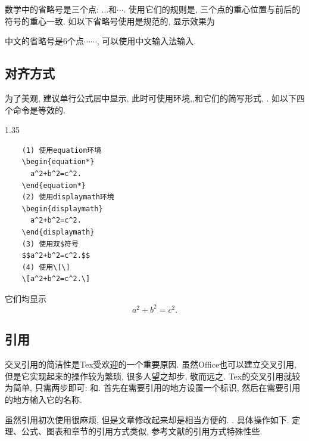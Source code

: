 \documentclass[a4paper,12pt,twoside]{ctexart}
\begin{document}
    数学中的省略号是三个点: $\ldots$和$\cdots$. 使用它们的规则是, 三个点的重心位置与前后的符号的重心一致. 如以下省略号使用是规范的,
    \noindent 显示效果为\medskip

    \noindent

    中文的省略号是6个点$\cdots\cdots$, 可以使用中文输入法输入.


\subsection{对齐方式}
    为了美观, 建议单行公式居中显示, 此时可使用环境,,和它们的简写形式, . 如以下四个命令是等效的. \\[-20pt]
    \begin{spacing}{1.35}
    \begin{verbatim}
    (1) 使用equation环境
    \begin{equation*}
      a^2+b^2=c^2.
    \end{equation*}
    (2) 使用displaymath环境
    \begin{displaymath}
      a^2+b^2=c^2.
    \end{displaymath}
    (3) 使用双$符号
    $$a^2+b^2=c^2.$$
    (4) 使用\[\]
    \[a^2+b^2=c^2.\]
    \end{verbatim}
    \end{spacing}\vspace*{-18pt}\noindent
    它们均显示
    \begin{displaymath}
      a^2+b^2=c^2.
    \end{displaymath}

\subsection{引用}
    交叉引用的简洁性是Tex受欢迎的一个重要原因. 虽然Office也可以建立交叉引用, 但是它实现起来的操作较为繁琐, 很多人望之却步, 敬而远之. Tex的交叉引用就较为简单, 只需两步即可: 和. 首先在需要引用的地方设置一个标识, 然后在需要引用的地方输入它的名称.

    虽然引用初次使用很麻烦, 但是文章修改起来却是相当方便的. . 具体操作如下. 定理、公式、图表和章节的引用方式类似, 参考文献的引用方式特殊性些.
\end{document}
